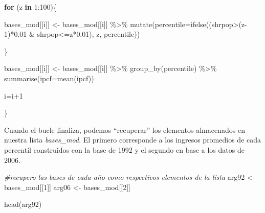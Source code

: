 \documentclass[
]{book}
\newenvironment{Shaded}{\begin{snugshade}}{\end{snugshade}}
\newcommand{\AttributeTok}[1]{\textcolor[rgb]{0.77,0.63,0.00}{#1}}
\newcommand{\CommentTok}[1]{\textcolor[rgb]{0.56,0.35,0.01}{\textit{#1}}}
\newcommand{\ControlFlowTok}[1]{\textcolor[rgb]{0.13,0.29,0.53}{\textbf{#1}}}
\newcommand{\DecValTok}[1]{\textcolor[rgb]{0.00,0.00,0.81}{#1}}
\newcommand{\FloatTok}[1]{\textcolor[rgb]{0.00,0.00,0.81}{#1}}
\newcommand{\FunctionTok}[1]{\textcolor[rgb]{0.00,0.00,0.00}{#1}}
\newcommand{\NormalTok}[1]{#1}
\newcommand{\OtherTok}[1]{\textcolor[rgb]{0.56,0.35,0.01}{#1}}
\newcommand{\SpecialCharTok}[1]{\textcolor[rgb]{0.00,0.00,0.00}{#1}}
\begin{document}
\begin{Shaded}
\begin{Highlighting}[]
      \ControlFlowTok{for}\NormalTok{ (z }\ControlFlowTok{in} \DecValTok{1}\SpecialCharTok{:}\DecValTok{100}\NormalTok{)\{}
    
\NormalTok{        bases\_mod[[i]] }\OtherTok{\textless{}{-}}\NormalTok{ bases\_mod[[i]] }\SpecialCharTok{\%\textgreater{}\%} \FunctionTok{mutate}\NormalTok{(}\AttributeTok{percentile=}\FunctionTok{ifelse}\NormalTok{((shrpop}\SpecialCharTok{\textgreater{}}\NormalTok{(z}\DecValTok{{-}1}\NormalTok{)}\SpecialCharTok{*}\FloatTok{0.01} \SpecialCharTok{\&}\NormalTok{ shrpop}\SpecialCharTok{\textless{}=}\NormalTok{z}\SpecialCharTok{*}\FloatTok{0.01}\NormalTok{), z,                                                                                percentile)) }
        
\NormalTok{      \}  }
  
\NormalTok{  bases\_mod[[i]] }\OtherTok{\textless{}{-}}\NormalTok{ bases\_mod[[i]] }\SpecialCharTok{\%\textgreater{}\%} \FunctionTok{group\_by}\NormalTok{(percentile) }\SpecialCharTok{\%\textgreater{}\%} \FunctionTok{summarise}\NormalTok{(}\AttributeTok{ipcf=}\FunctionTok{mean}\NormalTok{(ipcf))}
  
\NormalTok{  i}\OtherTok{=}\NormalTok{i}\SpecialCharTok{+}\DecValTok{1}  
  
\NormalTok{\}}
\end{Highlighting}
\end{Shaded}

Cuando el bucle finaliza, podemos ``recuperar'' los elementos almacenados en nuestra lista \emph{bases\_mod}. El primero corresponde a los ingresos promedios de cada percentil construidos con la base de 1992 y el segundo en base a los datos de 2006.

\begin{Shaded}
\begin{Highlighting}[]
\CommentTok{\#recupero las bases de cada año como respectivos elementos de la lista}
\NormalTok{arg92 }\OtherTok{\textless{}{-}}\NormalTok{ bases\_mod[[}\DecValTok{1}\NormalTok{]]}
\NormalTok{arg06 }\OtherTok{\textless{}{-}}\NormalTok{ bases\_mod[[}\DecValTok{2}\NormalTok{]]}
\end{Highlighting}
\end{Shaded}

\begin{Shaded}
\begin{Highlighting}[]
\FunctionTok{head}\NormalTok{(arg92)}
\end{Highlighting}
\end{Shaded}
\end{document}
